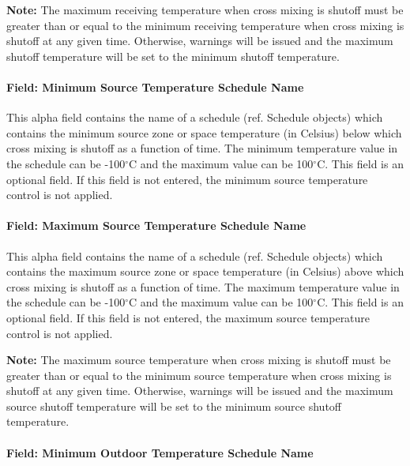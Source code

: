 \textbf{Note:} The maximum receiving temperature when cross mixing is shutoff must be greater than or equal to the minimum receiving temperature when cross mixing is shutoff at any given time. Otherwise, warnings will be issued and the maximum shutoff temperature will be set to the minimum shutoff temperature.

\paragraph{Field: Minimum Source Temperature Schedule Name}\label{field-minimum-source-zone-temperature-schedule-name-1}

This alpha field contains the name of a schedule (ref. Schedule objects) which contains the minimum source zone or space temperature (in Celsius) below which cross mixing is shutoff as a function of time. The minimum temperature value in the schedule can be -100$^\circ$C and the maximum value can be 100$^\circ$C. This field is an optional field. If this field is not entered, the minimum source temperature control is not applied.

\paragraph{Field: Maximum Source Temperature Schedule Name}\label{field-maximum-source-zone-temperature-schedule-name-1}

This alpha field contains the name of a schedule (ref. Schedule objects) which contains the maximum source zone or space temperature (in Celsius) above which cross mixing is shutoff as a function of time. The maximum temperature value in the schedule can be -100$^\circ$C and the maximum value can be 100$^\circ$C. This field is an optional field. If this field is not entered, the maximum source temperature control is not applied.

\textbf{Note:} The maximum source temperature when cross mixing is shutoff must be greater than or equal to the minimum source temperature when cross mixing is shutoff at any given time. Otherwise, warnings will be issued and the maximum source shutoff temperature will be set to the minimum source shutoff temperature.

\paragraph{Field: Minimum Outdoor Temperature Schedule Name}\label{field-minimum-outdoor-temperature-schedule-name-3}

